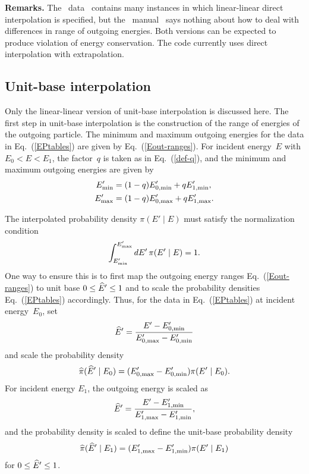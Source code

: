 \textbf{Remarks.}
The \ENDFdata\ data~\cite{ENDFdata} contains many instances in which
linear-linear direct interpolation is specified, but the \ENDF\ manual~\cite{ENDFB}
says nothing about how to deal with differences in range of outgoing
energies.  Both versions can be expected to produce violation of
energy conservation.  The {\gettransfer} code
currently uses direct interpolation with extrapolation.

\subsection{Unit-base interpolation}\label{Sec:unitBase}
Only the linear-linear version of unit-base interpolation is discussed here.
The first step in unit-base interpolation is the construction of the
range of energies of the outgoing particle.  
The minimum and maximum
outgoing energies for the data in Eq.~(\ref{EPtables})
are given by Eq.~(\ref{Eout-ranges}).
For incident energy~$E$ with $E_0 < E < E_1$, the factor~$q$
is taken as in Eq.~(\ref{def-q}), and
 the minimum and maximum outgoing energies
are given by
\begin{equation}
 \begin{split}
   E_{\text{min}}'& = ( 1 - q )E_{0,\text{min}}' + q E_{1,\text{min}}', \\
   E_{\text{max}}' & = ( 1 - q )E_{0,\text{max}}' + q E_{1,\text{max}}'.
  \label{EoutRange}
 \end{split}
\end{equation}

The interpolated probability density $\pi(E' \mid E)$ must
satisfy the normalization condition
\begin{equation}
  \int_{E_{\text{min}}'}^{E_{\text{max}}'} dE' \, \pi(E' \mid E) = 1.
 \label{probabilityNorm}
\end{equation}
One way to ensure this is to first map the outgoing energy ranges
Eq.~(\ref{Eout-ranges}) to unit base $0 \le \widehat E' \le 1$
and to scale the probability densities Eq.~(\ref{EPtables})
accordingly.  Thus, for the data in Eq.~(\ref{EPtables}) at
incident energy~$E_0$, set
\begin{equation}
  \widehat E' = \frac{ E' - E_{0,\text{min}}'}{ E_{0,\text{max}}' - E_{0,\text{min}}'}
  \label{unit-base-map}
\end{equation}
and scale the probability density
\begin{equation}
  \widehat \pi(\widehat E' \mid E_0) = ( E_{0,\text{max}}' - E_{0,\text{min}}' )\pi(E' \mid E_0).
  \label{unitbaseMap}
\end{equation}
For incident energy $E_1$, the outgoing energy is scaled
as
\begin{equation}
    \widehat E' = \frac{ E' - E_{1,\text{min}}'}{ E_{1,\text{max}}' - E_{1,\text{min}}'},
  \label{unit-base-map1}
\end{equation}
and the probability density
is scaled to define the unit-base probability
density 
\begin{equation}
  \widehat \pi(\widehat E' \mid E_1) = ( E_{1,\text{max}}' - E_{1,\text{min}}' )\pi(E' \mid E_1)
  \label{unitbaseMap1}
\end{equation}
for $0 \le \widehat E' \le 1$.

